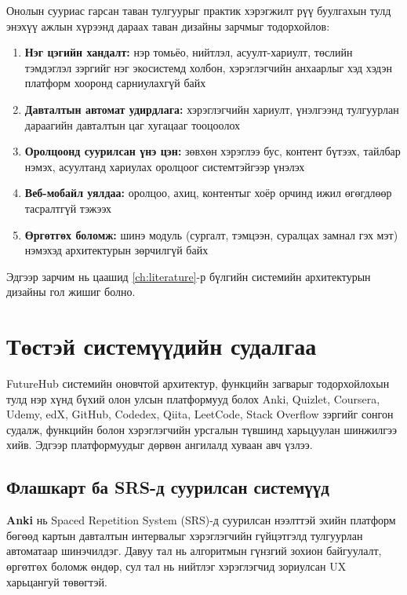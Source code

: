 Онолын сууриас гарсан таван тулгуурыг практик хэрэгжилт рүү буулгахын тулд энэхүү ажлын хүрээнд дараах таван дизайны зарчмыг тодорхойлов:

\begin{enumerate}[leftmargin=2em, itemsep=0.3em]
    \item \textbf{Нэг цэгийн хандалт:} нэр томьёо, нийтлэл, асуулт-хариулт, төслийн тэмдэглэл зэргийг нэг экосистемд холбон, хэрэглэгчийн анхаарлыг хэд хэдэн платформ хооронд сарниулахгүй байх
    \item \textbf{Давталтын автомат удирдлага:} хэрэглэгчийн хариулт, үнэлгээнд тулгуурлан дараагийн давталтын цаг хугацааг тооцоолох
    \item \textbf{Оролцоонд суурилсан үнэ цэн:} зөвхөн хэрэглээ бус, контент бүтээх, тайлбар нэмэх, асуултанд хариулах оролцоог системтэйгээр үнэлэх
    \item \textbf{Веб-мобайл уялдаа:} оролцоо, ахиц, контентыг хоёр орчинд ижил өгөгдлөөр тасралтгүй тэжээх
    \item \textbf{Өргөтгөх боломж:} шинэ модуль (сургалт, тэмцээн, суралцах замнал гэх мэт) нэмэхэд архитектурын зөрчилгүй байх
\end{enumerate}

Эдгээр зарчим нь цаашид \ref{ch:literature}-р бүлгийн системийн архитектурын дизайны гол жишиг болно.


\section{Төстэй системүүдийн судалгаа}

FutureHub системийн оновчтой архитектур, функцийн загварыг тодорхойлохын тулд нэр хүнд бүхий олон улсын платформууд болох Anki, Quizlet, Coursera, Udemy, edX, GitHub, Codedex, Qiita, LeetCode, Stack Overflow зэргийг сонгон судалж, функцийн болон хэрэглэгчийн урсгалын түвшинд харьцуулан шинжилгээ хийв. Эдгээр платформуудыг дөрвөн ангилалд хуваан авч үзлээ.

\subsection{Флашкарт ба SRS-д суурилсан системүүд}

\textbf{Anki} нь Spaced Repetition System (SRS)-д суурилсан нээлттэй эхийн платформ бөгөөд картын давталтын интервалыг хэрэглэгчийн гүйцэтгэлд тулгуурлан автоматаар шинэчилдэг. Давуу тал нь алгоритмын гүнзгий зохион байгуулалт, өргөтгөх боломж өндөр, сул тал нь нийтлэг хэрэглэгчид зориулсан UX харьцангуй төвөгтэй.

